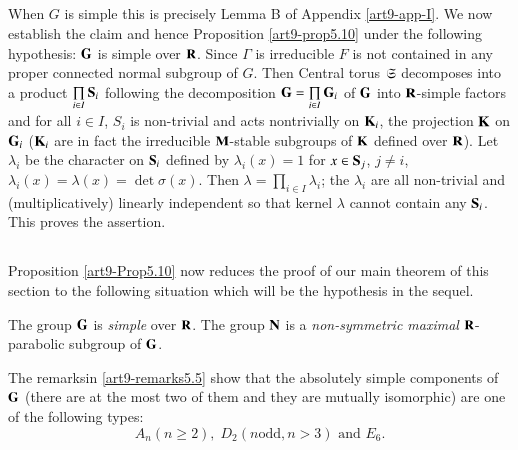\subsection{}\label{art9-subsec5.13}
When $G$ is simple this is precisely Lemma B of Appendix \ref{art9-app-I}. We now establish the claim and hence Proposition \ref{art9-prop5.10} under the following hypothesis: $\mathbf{G}$ is  simple over $\mathbf{R}$. Since $\Gamma$ is irreducible $F$ is not contained in any proper connected normal subgroup of $G$. Then Central torus $\mathfrak{S}$ decomposes into a product $\prod\limits_{i \in I} \mathbf{S}_i$ following the decomposition $\mathbf{G} = \prod\limits_{i \in I} \mathbf{G}_i$ of $\mathbf{G}$  into $\mathbf{R}$-simple factors and for all $i \in I$, $S_i$ is non-trivial and acts nontrivially on $\mathbf{K}_i$, the projection $\mathbf{K}$ on  $\mathbf{G}_i$ ($\mathbf{K}_i$ are in fact the irreducible $\mathbf{M}$-stable subgroups of $\mathbf{K}$ defined over $\mathbf{R}$). Let $\lambda_i$ be the character on $\mathbf{S}_i$ defined by $\lambda_i (x)=1$ for $x \in \mathbf{S}_j$, $j \neq i$, $\lambda_i (x) = \lambda (x) = \det \sigma (x)$. Then $\lambda = \prod\limits_{i \in I} \lambda_i$; the $\lambda_i$ are all non-trivial and (multiplicatively) linearly independent so that kernel $\lambda$ cannot contain any $\mathbf{S}_i$. This proves the assertion.


\subsection{}\label{art9-subsec5.14}
Proposition \ref{art9-Prop5.10} now reduces the proof of our main theorem of this section to the following situation which will be the hypothesis in the sequel. 

The group $\mathbf{G}$ is \textit{simple} over $\mathbf{R}$. The group $\mathbf{N}$ is a \textit{non-symmetric maximal} $\mathbf{R}$-parabolic subgroup of $\mathbf{G}$.

The remarks\pageoriginale in \ref{art9-remarks5.5} show that the absolutely simple components of $\mathbf{G}$ (there are at the most two of them and they are mutually isomorphic) are one of the following types:
$$
A_n (n \geqslant 2), \; D_2 (n \text{odd}, n > 3 ) \text{ and } E_6.
$$

\setcounter{subsection}{14}
